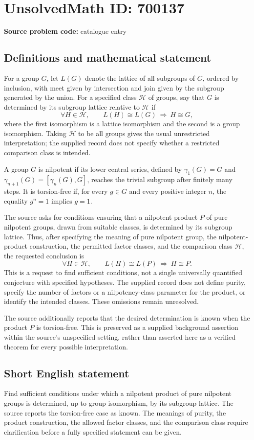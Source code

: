 \documentclass[11pt]{article}
\begin{document}
\section*{UnsolvedMath ID: 700137}
\textbf{Source problem code:} catalogue entry
\subsection{Definitions and mathematical statement}
For a group \(G\), let \(L(G)\) denote the lattice of all subgroups of \(G\), ordered by inclusion, with meet given by intersection and join given by the subgroup generated by the union. For a specified class \(\mathcal H\) of groups, say that \(G\) is determined by its subgroup lattice relative to \(\mathcal H\) if
\[
\forall H\in\mathcal H,\qquad L(H)\cong L(G)\ \Longrightarrow\ H\cong G,
\]
where the first isomorphism is a lattice isomorphism and the second is a group isomorphism. Taking \(\mathcal H\) to be all groups gives the usual unrestricted interpretation; the supplied record does not specify whether a restricted comparison class is intended.

A group \(G\) is nilpotent if its lower central series, defined by \(\gamma_1(G)=G\) and \(\gamma_{n+1}(G)=[\gamma_n(G),G]\), reaches the trivial subgroup after finitely many steps. It is torsion-free if, for every \(g\in G\) and every positive integer \(n\), the equality \(g^n=1\) implies \(g=1\).

The source asks for conditions ensuring that a nilpotent product \(P\) of pure nilpotent groups, drawn from suitable classes, is determined by its subgroup lattice. Thus, after specifying the meaning of pure nilpotent group, the nilpotent-product construction, the permitted factor classes, and the comparison class \(\mathcal H\), the requested conclusion is
\[
\forall H\in\mathcal H,\qquad L(H)\cong L(P)\ \Longrightarrow\ H\cong P.
\]
This is a request to find sufficient conditions, not a single universally quantified conjecture with specified hypotheses. The supplied record does not define purity, specify the number of factors or a nilpotency-class parameter for the product, or identify the intended classes. These omissions remain unresolved.

The source additionally reports that the desired determination is known when the product \(P\) is torsion-free. This is preserved as a supplied background assertion within the source's unspecified setting, rather than asserted here as a verified theorem for every possible interpretation.
\subsection{Short English statement}
Find sufficient conditions under which a nilpotent product of pure nilpotent groups is determined, up to group isomorphism, by its subgroup lattice. The source reports the torsion-free case as known. The meanings of purity, the product construction, the allowed factor classes, and the comparison class require clarification before a fully specified statement can be given.
\end{document}
